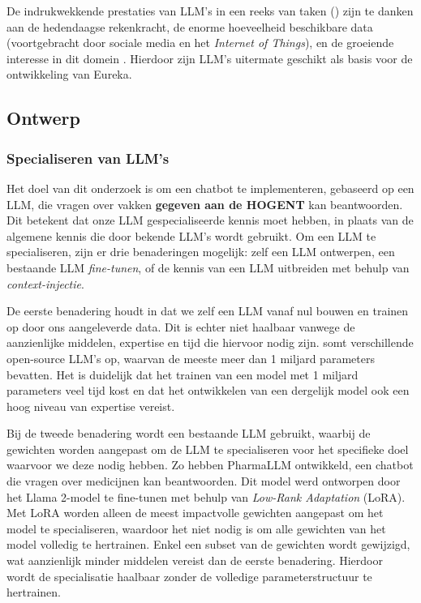 De indrukwekkende prestaties van LLM's in een reeks van taken (\autocite{Naveed2023}) zijn te danken aan de hedendaagse rekenkracht, de e\-nor\-me hoeveelheid beschikbare data (voortgebracht door sociale media en het \textit{Internet of Things}), en de groeiende interesse in dit domein \autocite{Zohuri2022, Naveed2023}. Hierdoor zijn LLM's uitermate geschikt als basis voor de ontwikkeling van Eureka. 

\subsection{Ontwerp}

\subsubsection{Specialiseren van LLM's}

Het doel van dit onderzoek is om een chatbot te implementeren, gebaseerd op een LLM, die vragen over vakken \textbf{gegeven aan de HOGENT} kan beantwoorden. Dit betekent dat onze LLM gespecialiseerde kennis moet hebben, in plaats van de algemene kennis die door bekende LLM's wordt gebruikt. Om een LLM te specialiseren, zijn er drie benaderingen mogelijk: zelf een LLM ontwerpen, een bestaande LLM \textit{fine-tunen}, of de kennis van een LLM uitbreiden met behulp van \textit{context-injectie}.

De eerste benadering houdt in dat we zelf een LLM vanaf nul bouwen en trainen op door ons aangeleverde data. Dit is echter niet haalbaar vanwege de aanzienlijke middelen, expertise \autocite{Naveed2023} en tijd die hiervoor nodig zijn. \textcite{Fourrier2024} somt verschillende open-source LLM's op, waarvan de meeste meer dan 1 miljard parameters bevatten. Het is duidelijk dat het trainen van een model met 1 miljard parameters veel tijd kost en dat het ontwikkelen van een dergelijk model ook een hoog niveau van expertise vereist.

Bij de tweede benadering wordt een bestaande LLM gebruikt, waarbij de gewichten worden aangepast om de LLM te specialiseren voor het specifieke doel waarvoor we deze nodig hebben. Zo hebben \textcite{Azam2024} PharmaLLM ontwikkeld, een chatbot die vragen over medicijnen kan beantwoorden. Dit model werd ontworpen door het Llama 2-model te fine-tunen met behulp van \textit{Low-Rank Adaptation} (LoRA). Met LoRA worden alleen de meest impactvolle gewichten aangepast om het model te specialiseren, waardoor het niet nodig is om alle gewichten van het model volledig te hertrainen. Enkel een subset van de gewichten wordt gewijzigd, wat aanzienlijk minder middelen vereist dan de eerste benadering. Hierdoor wordt de specialisatie haalbaar zonder de volledige parameterstructuur te hertrainen.

